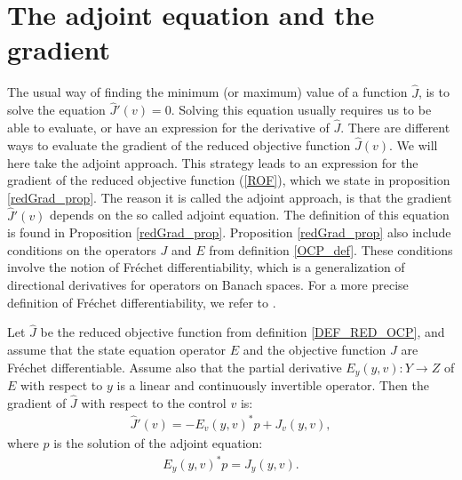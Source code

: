 \section{The adjoint equation and the gradient}
The usual way of finding the minimum (or maximum) value of a function $\hat J$, is to solve the equation $\hat J'(v)=0$. Solving this equation usually requires us to be able to evaluate, or have an expression for the derivative of $\hat J$. There are different ways to evaluate the gradient of the reduced objective function $\hat J(v)$. We will here take the adjoint approach. This strategy leads to an expression for the gradient of the reduced objective function (\ref{ROF}), which we state in proposition \ref{redGrad_prop}. The reason it is called the adjoint approach, is that the gradient $\hat J'(v)$ depends on the so called adjoint equation. The definition of this equation is found in Proposition \ref{redGrad_prop}. Proposition \ref{redGrad_prop} also include conditions on the operators $J$ and $E$ from definition \ref{OCP_def}. These conditions involve the notion of Fr\'{e}chet differentiability, which is a generalization of directional derivatives for operators on Banach spaces. For a more precise definition of Fr\'{e}chet differentiability, we refer to \cite{hinze2008optimization}.
\begin{proposition} \label{redGrad_prop}
Let $\hat J$ be the reduced objective function from definition \ref{DEF_RED_OCP}, and assume that the state equation operator $E$ and the objective function $J$ are Fr\'{e}chet differentiable. Assume also that the partial derivative $E_y(y,v):Y\rightarrow Z$ of $E$ with respect to $y$ is a linear and continuously invertible operator. Then the gradient of $\hat J$ with respect to the control $v$ is:
\begin{align}
\hat J'(v) = -E_v(y,v)^*p + J_v(y,v),\label{gradient}
\end{align}
where $p$ is the solution of the adjoint equation:
\begin{align}
E_y(y,v)^{*}p=J_y(y,v). \label{general adjoint}
\end{align}
\end{proposition}
